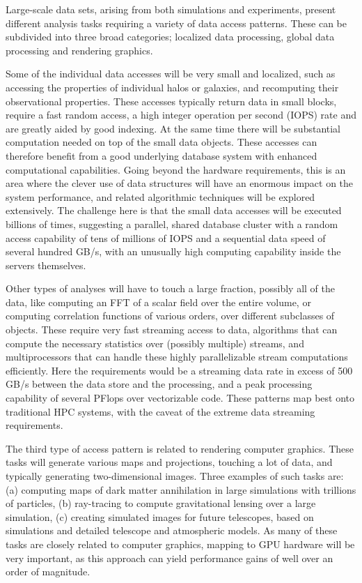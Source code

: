 Large-scale data sets, arising from both simulations and experiments,
present different analysis tasks requiring a variety of data access
patterns. These can be subdivided into three broad categories;
localized data processing, global data processing and rendering graphics.

Some of the individual data accesses will be very small and localized,
such as accessing the properties of individual halos or galaxies, and
recomputing their observational properties. These accesses typically
return data in small blocks, require a fast random access, a high 
integer operation per second (IOPS) rate
and are greatly aided by good indexing. At the same time there
will be substantial computation needed on top of the small data
objects. These accesses can therefore benefit from a good underlying
database system with enhanced computational capabilities. Going beyond
the hardware requirements, this is an area where the clever use of
data structures will have an enormous impact on the system
performance, and related algorithmic techniques will be explored
extensively. The challenge here is that the small data accesses will
be executed billions of times, suggesting a parallel, shared database
cluster with a random access capability of tens of millions of IOPS
and a sequential data speed of several hundred GB/s, with an unusually
high computing capability inside the servers themselves.

Other types of analyses will have to
touch a large fraction, possibly all of the data, like computing an
FFT of a scalar field over the entire volume, or computing correlation
functions of various orders, over different subclasses of
objects. These require very fast streaming access to data, algorithms
that can compute the necessary statistics over (possibly multiple)
streams, and multiprocessors that can handle these highly parallelizable
stream computations efficiently.  Here the
requirements would be a streaming data rate in excess of 500 GB/s
between the data store and the processing, and a peak processing
capability of several PFlops over vectorizable code. These patterns
map best onto traditional HPC systems, with the caveat of the extreme
data streaming requirements.

The third type of access pattern is related to rendering computer
graphics. These tasks will generate various maps and projections,
touching a lot of data, and typically generating two-dimensional images. 
Three examples of such tasks are:
(a) computing maps of dark matter annihilation in large
simulations with trillions of particles, (b) ray-tracing to compute
gravitational lensing over a large simulation, (c) creating simulated
images for future telescopes, based on simulations and detailed
telescope and atmospheric models. As many of these tasks are closely
related to computer graphics, mapping to GPU hardware will be very
important, as this approach can yield performance gains of well over
an order of magnitude.


